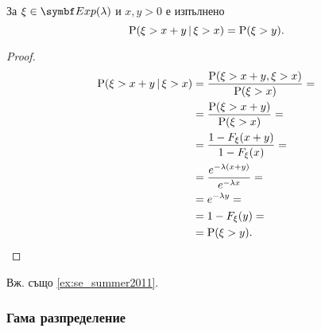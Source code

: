 \documentclass{../../common/topic}
\begin{document}
\begin{theorem}\label{thm:memorylessness}
  За \( \xi \in \distr{Exp}(\lambda) \) и \( x, y > 0 \) е изпълнено
  \begin{equation*}
    \Prob(\xi > x + y \given \xi > x) = \Prob(\xi > y).
  \end{equation*}
\end{theorem}
\begin{proof}
  \begin{align*}
    \Prob(\xi > x + y \given \xi > x)
    &=
    \frac {\Prob(\xi > x + y, \xi > x)} {\Prob(\xi > x)}
    = \\ &=
    \frac {\Prob(\xi > x + y)} {\Prob(\xi > x)}
    = \\ &=
    \frac {1-F_\xi(x+y)} {1-F_\xi(x)}
    = \\ &=
    \frac {e^{-\lambda(x+y)}} {e^{-\lambda x}}
    = \\ &=
    e^{-\lambda y}
    = \\ &=
    1-F_\xi(y)
    = \\ &=
    \Prob(\xi > y).
  \end{align*}
\end{proof}

Вж. също \cref{ex:se_summer2011}.

\subsubsection{Гама разпределение}\label{sec:gamma}
\end{document}
